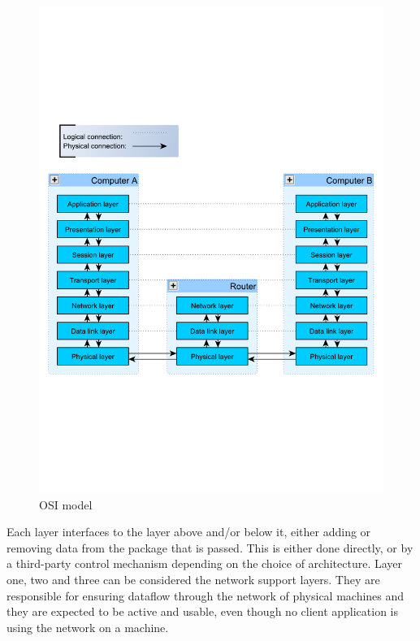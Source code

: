 \begin{figure}[htb]
	\begin{center}
	\includegraphics[scale=0.5,trim=0 200 0 200]{content/graphics/OsiStack.pdf} %
	\caption{OSI model}
	\label{fig:osi_model_stack}			%
	\end{center}
\end{figure}


Each layer interfaces to the layer above and/or below it, either adding or removing data from the package that is passed. This is either done directly, or by a third-party control mechanism depending on the choice of architecture.
Layer one, two and three can be considered the network support layers. They are responsible for ensuring dataflow through the network of physical machines and they are expected to be active and usable, even though no client application is using the network on a machine.

